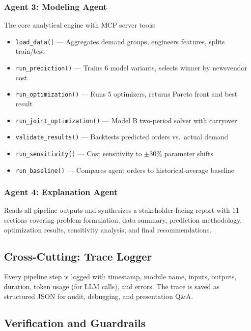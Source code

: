 \documentclass[11pt, letterpaper]{article}
\begin{document}
\subsubsection{Agent 3: Modeling Agent}
The core analytical engine with MCP server tools:
\begin{itemize}[nosep]
    \item \texttt{load\_data()} --- Aggregates demand groups, engineers features, splits train/test
    \item \texttt{run\_prediction()} --- Trains 6 model variants, selects winner by newsvendor cost
    \item \texttt{run\_optimization()} --- Runs 5 optimizers, returns Pareto front and best result
    \item \texttt{run\_joint\_optimization()} --- Model B two-period solver with carryover
    \item \texttt{validate\_results()} --- Backtests predicted orders vs.\ actual demand
    \item \texttt{run\_sensitivity()} --- Cost sensitivity to $\pm$30\% parameter shifts
    \item \texttt{run\_baseline()} --- Compares agent orders to historical-average baseline
\end{itemize}

\subsubsection{Agent 4: Explanation Agent}
Reads all pipeline outputs and synthesizes a stakeholder-facing report with 11 sections covering problem formulation, data summary, prediction methodology, optimization results, sensitivity analysis, and final recommendations.

\subsection{Cross-Cutting: Trace Logger}

Every pipeline step is logged with timestamp, module name, inputs, outputs, duration, token usage (for LLM calls), and errors. The trace is saved as structured JSON for audit, debugging, and presentation Q\&A.

\subsection{Verification and Guardrails}
\end{document}
